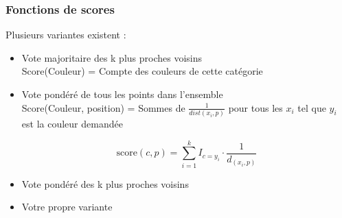 \documentclass[french]{beamer}
\begin{document}
\begin{frame}
\frametitle{Fonctions de scores}
Plusieurs variantes existent :
\begin{itemize}
\item{Vote majoritaire des k plus proches voisins}\\
Score(Couleur) = Compte des couleurs de cette catégorie

\item{Vote pondéré de tous les points dans l'ensemble}\\

Score(Couleur, position) = Sommes de $\frac{1}{dist(x_i,p)}$ pour tous les $x_i$ tel que $y_i$ est la couleur demandée

$$\text{score}(c, p) = \sum_{i=1}^k I_{c=y_i} \cdot \frac{1}{d_(x_i,p)}$$
\item{Vote pondéré des k plus proches voisins}\\


\item{Votre propre variante}\\

\end{itemize}

\end{frame}
\end{document}
